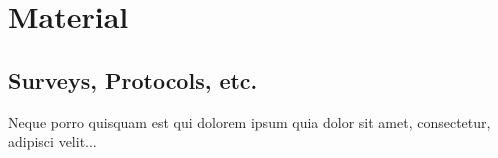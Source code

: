     \appendix

        \chapter{Material}

            \section{Surveys, Protocols, etc.}

                Neque porro quisquam est qui dolorem ipsum quia dolor sit amet, consectetur, adipisci velit...


        \listoffigures %
        \listoftables %


     
    

    \clearpage\thispagestyle{empty}
    \eigen  %

